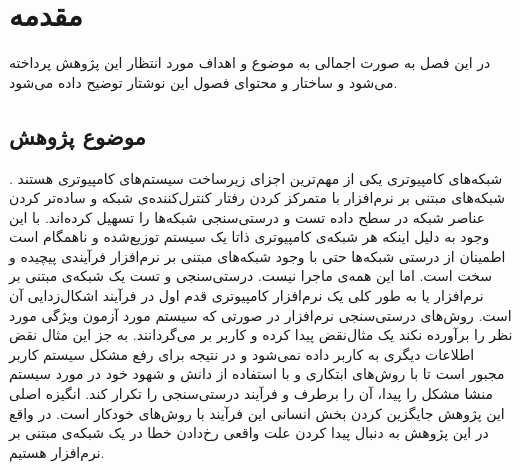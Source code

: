 \chapter{مقدمه}
در این فصل به صورت اجمالی به موضوع و اهداف مورد انتظار این پژوهش پرداخته می‌شود و ساختار و محتوای فصول این نوشتار توضیح داده می‌شود.
\section{موضوع پژوهش}
شبکه‌های کامپیوتری یکی از مهم‌ترین اجزای زیرساخت سیستم‌های کامپیوتری هستند
\cite{foerster2018survey}.
شبکه‌های مبتنی بر نرم‌افزار با متمرکز کردن رفتار کنترل‌کننده‌ی شبکه و ساده‌تر کردن عناصر شبکه در سطح داده
تست و درستی‌سنجی شبکه‌ها را تسهیل کرده‌اند.
با این وجود به دلیل اینکه هر شبکه‌‌ی کامپیوتری ذاتا یک سیستم توزیع‌شده و ناهمگام
است
اطمینان از درستی شبکه‌ها حتی‌ با وجود شبکه‌های مبتنی بر نرم‌افزار فرآیندی پیچیده و سخت است.
اما این همه‌ی ماجرا نیست.
درستی‌سنجی و تست یک شبکه‌ی مبتنی بر نرم‌افزار یا به طور کلی یک نرم‌افزار کامپیوتری قدم اول در فرآیند اشکال‌زدایی
آن است.
روش‌های درستی‌سنجی نرم‌افزار در صورتی که سیستم مورد آزمون ویژگی مورد نظر را برآورده نکند یک مثال‌نقض پیدا کرده و کاربر بر می‌گردانند.
به جز این مثال نقض اطلاعات دیگری به کاربر داده نمی‌شود و در نتیجه برای رفع مشکل سیستم کاربر مجبور است تا با روش‌های ابتکاری و با استفاده از دانش و شهود خود در مورد سیستم منشا مشکل را پیدا، آن را برطرف و فرآیند درستی‌سنجی را تکرار کند.
انگیزه اصلی این پژوهش جایگزین کردن بخش انسانی این فرآیند با روش‌های خودکار است.
در واقع در این پژوهش به دنبال پیدا کردن علت واقعی رخ‌دادن خطا در یک شبکه‌ی مبتنی بر نرم‌افزار هستیم.

